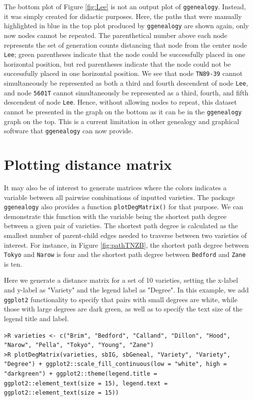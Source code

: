 \documentclass[11pt,a4paper,oldfontcommands,openany]{memoir}
\DeclareRobustCommand{\mybox}[2][gray!15]{%
\begin{tcolorbox}[   %
        breakable,
        left=0pt,
        right=0pt,
        top=0pt,
        bottom=0pt,
        colback=#1,
        colframe=#1,
        width=\dimexpr\textwidth\relax, 
        enlarge left by=0mm,
        boxsep=5pt,
        arc=0pt,outer arc=0pt,
        ]
        #2
\end{tcolorbox}
}
\numberwithin{equation}{section} %
\newcommand{\code}[1]{{\texttt{#1}}}
\newcommand{\pkg}[1]{{\texttt{#1}}}
\begin{document}
The bottom plot of Figure \ref{fig:Lee} is not an output plot of \pkg{ggenealogy}. Instead, it was simply created for didactic purposes. Here, the paths that were manually highlighted in blue in the top plot produced by \pkg{ggenealogy} are shown again, only now nodes cannot be repeated. The parenthetical number above each node represents the set of generation counts distancing that node from the center node \code{Lee}; green parentheses indicate that the node could be successfully placed in one horizontal position, but red parentheses indicate that the node could not be successfully placed in one horizontal position. We see that node \code{TN89-39} cannot simultaneously be represented as both a third and fourth descendent of node \code{Lee}, and node \code{5601T} cannot simultaneously be represented as a third, fourth, and fifth descendent of node \code{Lee}. Hence, without allowing nodes to repeat, this dataset cannot be presented in the graph on the bottom as it can be in the \pkg{ggenealogy} graph on the top. This is a current limitation in other genealogy and graphical software that \pkg{ggenealogy} can now provide.

\section{Plotting distance matrix}

It may also be of interest to generate matrices where the colors indicates a variable between all pairwise combinations of inputted varieties. The package \pkg{ggenealogy} also provides a function \code{plotDegMatrix()} for that purpose. We can demonstrate this function with the variable being the shortest path degree between a given pair of varieties. The shortest path degree is calculated as the smallest number of parent-child edges needed to traverse between two varieties of interest. For instance, in Figure \ref{fig:pathTNZB}, the shortest path degree between \code{Tokyo} and \code{Narow} is four and the shortest path degree between \code{Bedford} and \code{Zane} is ten.

Here we generate a distance matrix for a set of 10 varieties, setting the x-label and y-label as "Variety" and the legend label as "Degree". In this example, we add \pkg{ggplot2} functionality to specify that pairs with small degrees are white, while those with large degrees are dark green, as well as to specify the text size of the legend title and label.

\mybox{
\texttt{>R varieties <- c("Brim", "Bedford", "Calland", "Dillon", "Hood", "Narow", "Pella", "Tokyo", "Young", "Zane")}\\
\texttt{>R plotDegMatrix(varieties, sbIG, sbGeneal, "Variety", "Variety", "Degree") + ggplot2::scale\_fill\_continuous(low = "white", high = "darkgreen") + ggplot2::theme(legend.title = ggplot2::element\_text(size = 15), legend.text = ggplot2::element\_text(size = 15))}
}
\end{document}
